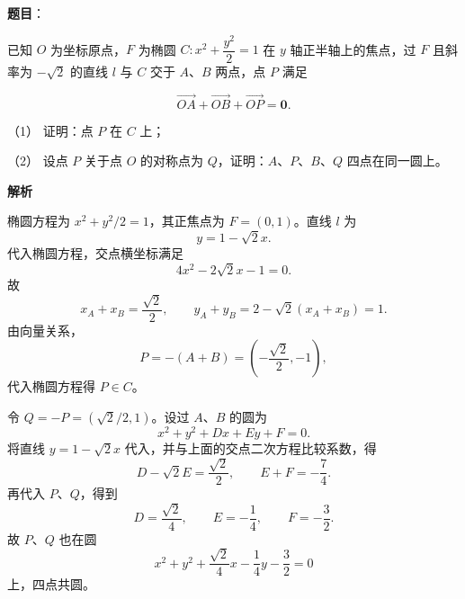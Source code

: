 \begin{answer}

\textbf{题目}：

已知 $O$ 为坐标原点，$F$ 为椭圆 $C:x^2+\dfrac{y^2}{2}=1$ 在 $y$ 轴正半轴上的焦点，过 $F$ 且斜率为 $-\sqrt2$ 的直线 $l$ 与 $C$ 交于 $A\text{、}B$ 两点，点 $P$ 满足

\nopagebreak[4]
\[
\overrightarrow{OA}+\overrightarrow{OB}+\overrightarrow{OP}=\boldsymbol0.
\]
\nopagebreak[4]
\begin{center}\end{center}
\nopagebreak[4]
（1） 证明：点 $P$ 在 $C$ 上；

（2） 设点 $P$ 关于点 $O$ 的对称点为 $Q$，证明：$A\text{、}P\text{、}B\text{、}Q$ 四点在同一圆上。

\textbf{解析}


椭圆方程为 $x^2+y^2/2=1$，其正焦点为
$F=(0,1)$。直线 $l$ 为
\nopagebreak[4]
\[
y=1-\sqrt2x.
\]
代入椭圆方程，交点横坐标满足
\nopagebreak[4]
\[
4x^2-2\sqrt2x-1=0.
\]
故
\nopagebreak[4]
\[
x_A+x_B=\frac{\sqrt2}{2},\qquad
y_A+y_B=2-\sqrt2(x_A+x_B)=1.
\]
由向量关系，
\nopagebreak[4]
\[
P=-(A+B)=\left(-\frac{\sqrt2}{2},-1\right),
\]
代入椭圆方程得 $P\in C$。


令 $Q=-P=(\sqrt2/2,1)$。设过 $A\text{、}B$ 的圆为
\nopagebreak[4]
\[
x^2+y^2+Dx+Ey+F=0.
\]
将直线 $y=1-\sqrt2x$ 代入，并与上面的交点二次方程比较系数，得
\nopagebreak[4]
\[
D-\sqrt2E=\frac{\sqrt2}{2},\qquad E+F=-\frac74.
\]
再代入 $P\text{、}Q$，得到
\nopagebreak[4]
\[
D=\frac{\sqrt2}{4},\qquad E=-\frac14,\qquad F=-\frac32.
\]
故 $P\text{、}Q$ 也在圆
\nopagebreak[4]
\[
x^2+y^2+\frac{\sqrt2}{4}x-\frac14y-\frac32=0
\]
上，四点共圆。



\end{answer}
